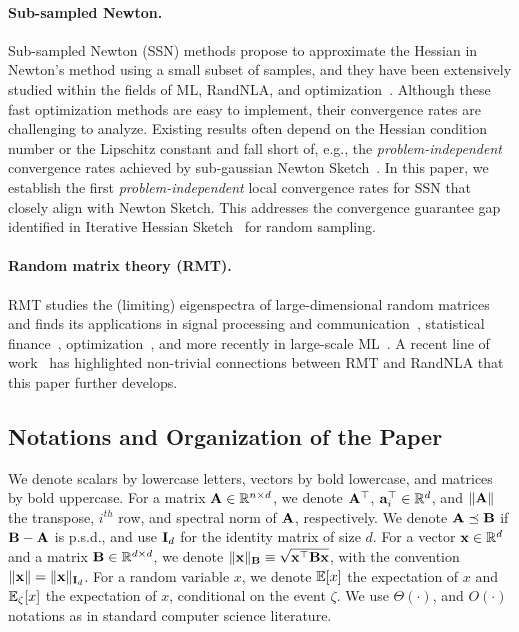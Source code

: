\documentclass[11pt,a4paper]{article}
\begin{document}
\paragraph{Sub-sampled Newton.}
Sub-sampled Newton (SSN) methods propose to approximate the Hessian in Newton's method using a small subset of samples, and they have been extensively studied within the fields of ML, RandNLA, and optimization~\citep{xu2016subsampled,bollapragada2019exact,roosta2019subsampled,xu2020newton,ye2021approximate}.
Although these fast optimization methods are easy to implement, their convergence rates are challenging to analyze.
Existing results often depend on the Hessian condition number or the Lipschitz constant and fall short of, e.g., the \emph{problem-independent} convergence rates achieved by sub-gaussian Newton Sketch~\citep{lacotte2019faster,derezinski2021newtonless}.
In this paper, we establish the first \emph{problem-independent} local convergence rates for SSN that closely align with Newton Sketch. 
This addresses the convergence guarantee gap identified in Iterative Hessian Sketch~\citep{pilanci2016iterative} for random sampling.



\paragraph{Random matrix theory (RMT).}
RMT studies the (limiting) eigenspectra of large-dimensional random matrices~\citep{anderson2010introduction} and finds its applications in signal processing and communication~\citep{couillet2011random}, statistical finance~\citep{plerou2002Random}, optimization~\citep{paquette2021SGDa,paquette2023Haltinga}, and more recently in large-scale ML~\citep{pennington2017nonlinear,fan2020spectra,mei2021generalization,couillet2022RMT4ML}.
A recent line of work~\cite{liao2020random,liao2021sparse,liao2021hessian} has highlighted non-trivial connections between RMT and RandNLA that this paper further develops.



\subsection{Notations and Organization of the Paper} 

We denote scalars by lowercase letters, vectors by bold lowercase, and matrices by bold uppercase.
For a matrix $\mathbf{A}\in {\mathbb{R}}^{n\times d}$, we denote $\mathbf{A}^\top$, $\mathbf{a}^\top_i \in {\mathbb{R}}^{d}$, and $\|\mathbf{A}\|$ the transpose, $i^{th}$ row, and spectral norm of $\mathbf{A}$, respectively.
We denote $\mathbf{A} \preceq \mathbf{B}$ if $\mathbf{B} - \mathbf{A}$ is p.s.d., and use $\mathbf{I}_d$ for the identity matrix of size $d$.
For a vector $\mathbf{x} \in {\mathbb{R}}^d$ and a matrix $\mathbf{B} \in {\mathbb{R}}^{d \times d}$, we denote $\| \mathbf{x} \|_{\mathbf{B}} \equiv \sqrt{\mathbf{x}^\top \mathbf{B} \mathbf{x}}$, with the convention $\| \mathbf{x} \| = \| \mathbf{x} \|_{\mathbf{I}_d}$. %
For a random variable $x$, we denote ${\mathbb{E}}[x]$ the expectation of $x$ and ${\mathbb{E}}_{\zeta}[x]$ the expectation of $x$, conditional on the event $\zeta$.
We use  $\Theta(\cdot)$, and $O(\cdot)$ notations as in standard computer science literature.
\end{document}
